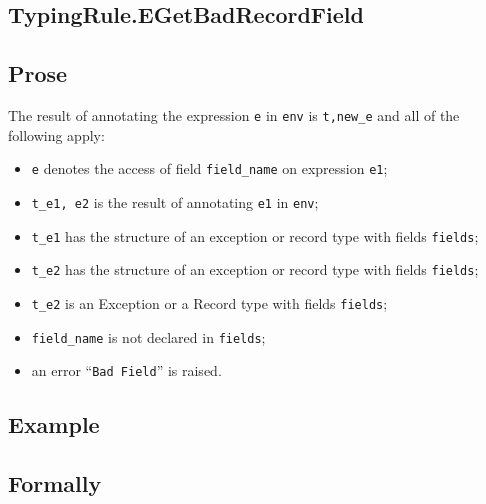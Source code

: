 \documentclass{book}
\begin{document}
\begin{itemize}

\section{TypingRule.EGetBadRecordField \label{sec:TypingRule.EGetBadRecordField}}

  \subsection{Prose}
  The result of annotating the expression \texttt{e} in \texttt{env} is
\texttt{t,new\_e} and all of the following apply:
  \begin{itemize}
  \item \texttt{e} denotes the access of field \texttt{field\_name} on expression \texttt{e1};
  \item \texttt{t\_e1, e2} is the result of annotating \texttt{e1} in \texttt{env};
  \item \texttt{t\_e1} has the structure of an exception or record type with fields \texttt{fields};
  \item \texttt{t\_e2} has the structure of an exception or record type with fields \texttt{fields};
  \item \texttt{t\_e2} is an Exception or a Record type with fields \texttt{fields};
  \item \texttt{field\_name} is not declared in \texttt{fields};
  \item an error ``\texttt{Bad Field}'' is raised.
  \end{itemize}

  \subsection{Example}



\begin{emptyformal}
    \subsection{Formally}

\end{emptyformal}



\end{itemize}
\end{document}
